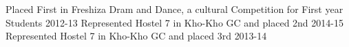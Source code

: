 \begin{cvhonors}
  \cvhonor
    {}
    {\hspace{-1.5mm}Placed First in Freshiza Dram and Dance, a cultural Competition for First year Students}
    {}
    {2012-13}
   \cvhonor
    {}
    {\hspace{-1.5mm}Represented Hostel 7 in Kho-Kho GC and placed 2nd }
    {}
    {2014-15}
  \cvhonor
    {}
    {\hspace{-1.5mm}Represented Hostel 7 in Kho-Kho GC and placed 3rd }
    {}
    {2013-14}
   
\end{cvhonors}
